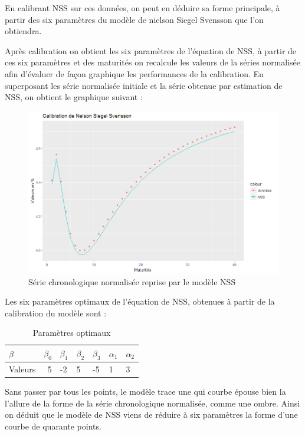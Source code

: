 En calibrant NSS sur ces données, on peut en déduire sa forme principale, à partir des six paramètres du modèle de nielson Siegel Svensson que l'on obtiendra.

Après calibration on obtient les six paramètres de l'équation de NSS, à partir de ces six paramètres et des maturités on recalcule les valeurs de la séries normalisée afin d'évaluer de façon graphique les performances de la calibration. En superposant les série normalisée initiale et la série obtenue par estimation de NSS, on obtient le graphique suivant :

\begin{figure}[H]
\centering
\caption{Série chronologique normalisée reprise par le modèle NSS}
   \includegraphics[scale=0.7]{img/nss.png}
\end{figure}

Les six paramètres optimaux de l'équation de NSS, obtenues à partir de la calibration du modèle sont : 

\begin{table}[H]
\centering
\caption{Paramètres optimaux}
\label{my-label}
\begin{tabular}{|l|r|l|l|l|l|l|}
\hline
$\beta$ & $\beta_0$ & $\beta_1 $ & $\beta_2$ & $\beta_3$ & $\alpha_1$ & $\alpha_2$ \\ \hline
Valeurs & 5 & -2 & 5 & -5 & 1 & 3 \\ \hline
\end{tabular}
\end{table}

Sans passer par tous les points, le modèle trace une qui courbe épouse bien la l'allure de la forme de la série chronologique normalisée, comme une ombre. Ainsi on déduit que le modèle de NSS viens de réduire à six paramètres la forme d'une courbe de quarante points.

